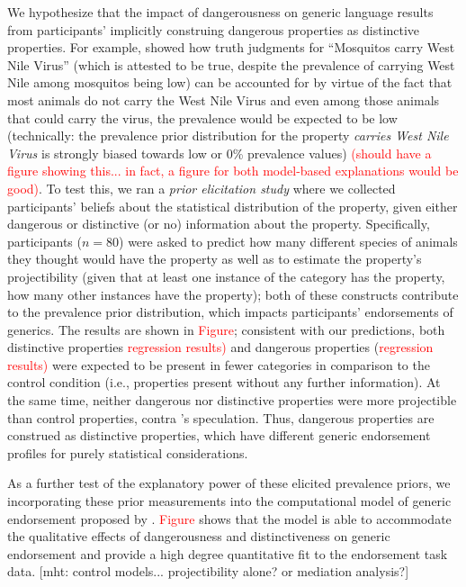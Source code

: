 \documentclass[floatsintext, 11pt, doc]{apa6}
\newcommand{\red}[1]{\textcolor{Red}{#1}}
\newcommand{\mht}[1]{\textcolor{blueish}{[mht: #1]}}
\begin{document}
We hypothesize that the impact of dangerousness on generic language results from participants' implicitly construing dangerous properties as distinctive properties. 
For example,  showed how truth judgments for ``Mosquitos carry West Nile Virus'' (which is attested to be true, despite the prevalence of carrying West Nile among mosquitos being low) can be accounted for by virtue of the fact that most animals do not carry the West Nile Virus and even among those animals that could carry the virus, the prevalence would be expected to be low (technically: the prevalence prior distribution for the property \emph{carries West Nile Virus} is strongly biased towards low or 0\% prevalence values) \red{(should have a figure showing this... in fact, a figure for both model-based explanations would be good)}. 
To test this, we ran a \emph{prior elicitation study} where we collected participants' beliefs about the statistical distribution of the property, given either dangerous or distinctive (or no) information about the property. 
Specifically, participants ($n=80$) were asked to predict how many different species of animals they thought would have the property as well as to estimate the property's projectibility (given that at least one instance of the category has the property, how many other instances have the property); both of these constructs contribute to the prevalence prior distribution, which impacts participants' endorsements of generics.
The results are shown in \red{Figure}; consistent with our predictions, both distinctive properties \red{regression results)} and dangerous properties (\red{regression results)} were expected to be present in fewer categories in comparison to the control condition (i.e., properties present without any further information). 
At the same time, neither dangerous nor distinctive properties were more projectible than control properties, contra 's speculation. 
Thus, dangerous properties are construed as distinctive properties, which have different generic endorsement profiles for purely statistical considerations. 

As a further test of the explanatory power of these elicited prevalence priors, we incorporating these prior measurements into the computational model of generic endorsement proposed by \cite{Tessler2019}.
\red{Figure} shows that the model is able to accommodate the qualitative effects of dangerousness and distinctiveness on generic endorsement and provide a high degree quantitative fit to the endorsement task data. 
\mht{control models... projectibility alone? or mediation analysis?}
\end{document}
